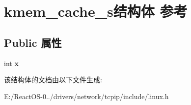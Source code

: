 \hypertarget{structkmem__cache__s}{}\section{kmem\+\_\+cache\+\_\+s结构体 参考}
\label{structkmem__cache__s}
\subsection*{Public 属性}
\begin{DoxyCompactItemize}
\item 
\mbox{\label{structkmem__cache__s_ad94ef257d05f80b366e43c7560bc6ac8}} 
int {\bfseries x}
\end{DoxyCompactItemize}


该结构体的文档由以下文件生成\+:\begin{DoxyCompactItemize}
\item 
E\+:/\+React\+O\+S-\/0../drivers/network/tcpip/include/linux.\+h\end{DoxyCompactItemize}
